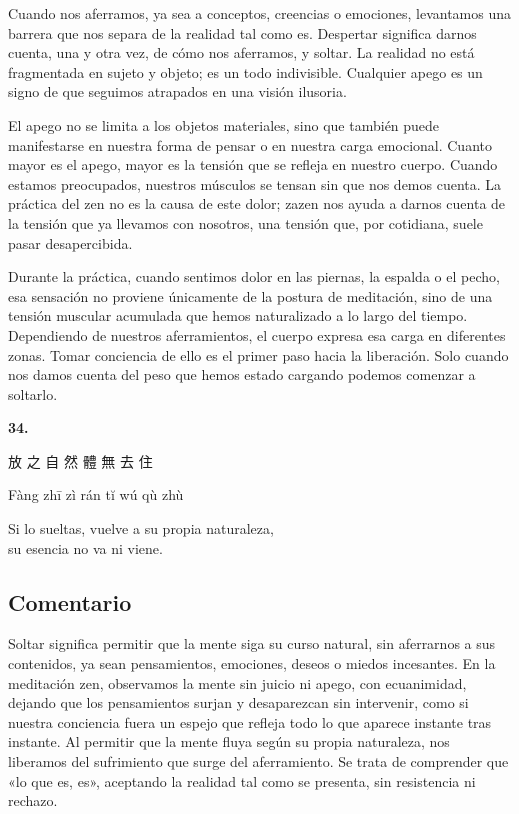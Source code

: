 \documentclass[
  a5paperpaper,
]{article}
\begin{document}
Cuando nos aferramos, ya sea a conceptos, creencias o emociones,
levantamos una barrera que nos separa de la realidad tal como es.
Despertar significa darnos cuenta, una y otra vez, de cómo nos
aferramos, y soltar. La realidad no está fragmentada en sujeto y objeto;
es un todo indivisible. Cualquier apego es un signo de que seguimos
atrapados en una visión ilusoria.

El apego no se limita a los objetos materiales, sino que también puede
manifestarse en nuestra forma de pensar o en nuestra carga emocional.
Cuanto mayor es el apego, mayor es la tensión que se refleja en nuestro
cuerpo. Cuando estamos preocupados, nuestros músculos se tensan sin que
nos demos cuenta. La práctica del zen no es la causa de este dolor;
zazen nos ayuda a darnos cuenta de la tensión que ya llevamos con
nosotros, una tensión que, por cotidiana, suele pasar desapercibida.

Durante la práctica, cuando sentimos dolor en las piernas, la espalda o
el pecho, esa sensación no proviene únicamente de la postura de
meditación, sino de una tensión muscular acumulada que hemos
naturalizado a lo largo del tiempo. Dependiendo de nuestros
aferramientos, el cuerpo expresa esa carga en diferentes zonas. Tomar
conciencia de ello es el primer paso hacia la liberación. Solo cuando
nos damos cuenta del peso que hemos estado cargando podemos comenzar a
soltarlo.

\hfill\break

\hypertarget{04}{}
\begin{verseblock}

\newpage

\begin{center}\textbf{34.}\end{center}

放 之 自 然 體 無 去 住

Fàng zhī zì rán tĭ wú qù zhù

Si lo sueltas, vuelve a su propia naturaleza,\\
su esencia no va ni viene.

\end{verseblock}

\hfill\break

\hypertarget{comentario-33}{%
\subsection{Comentario}\label{comentario-33}}

Soltar significa permitir que la mente siga su curso natural, sin
aferrarnos a sus contenidos, ya sean pensamientos, emociones, deseos o
miedos incesantes. En la meditación zen, observamos la mente sin juicio
ni apego, con ecuanimidad, dejando que los pensamientos surjan y
desaparezcan sin intervenir, como si nuestra conciencia fuera un espejo
que refleja todo lo que aparece instante tras instante. Al permitir que
la mente fluya según su propia naturaleza, nos liberamos del sufrimiento
que surge del aferramiento. Se trata de comprender que «lo que es, es»,
aceptando la realidad tal como se presenta, sin resistencia ni rechazo.
\end{document}
